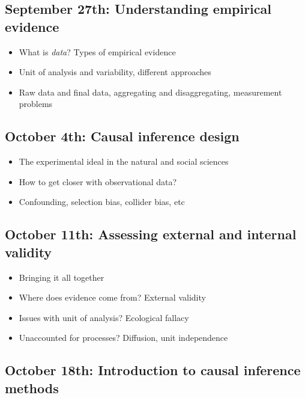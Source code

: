 \documentclass[12pt, a4paper]{article}
\begin{document}
\subsection*{September 27th: Understanding empirical evidence}

\begin{itemize}
\setlength\itemsep{-5pt}
  \item What is \textit{data}? Types of empirical evidence
  \item Unit of analysis and variability, different approaches %
  \item Raw data and final data, aggregating and disaggregating, measurement problems
\end{itemize}

\subsection*{October 4th: Causal inference design}

\begin{itemize}
\setlength\itemsep{-5pt}
  \item The experimental ideal in the natural and social sciences
  \item How to get closer with observational data?
  \item Confounding, selection bias, collider bias, etc
\end{itemize}

\subsection*{October 11th: Assessing external and internal validity}

\begin{itemize}
\setlength\itemsep{-5pt}
  \item Bringing it all together
  \item Where does evidence come from? External validity
  \item Issues with unit of analysis? Ecological fallacy
  \item Unaccounted for processes? Diffusion, unit independence
\end{itemize}

\subsection*{October 18th: Introduction to causal inference methods}
\end{document}
